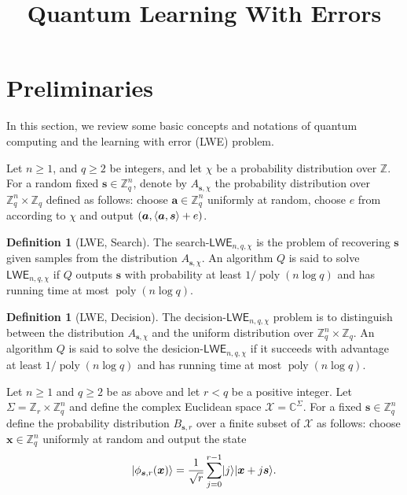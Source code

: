 \documentclass[11pt]{article}
\title{Quantum Learning With Errors}
\author{
}
\date{}
\theoremstyle{plain}
\theoremstyle{definition}
\newtheorem{definition}[theorem]{Definition}
\DeclareMathOperator{\poly}{poly}
\DeclarePairedDelimiter{\ldbrac}{\lvert}{\rangle}
\DeclarePairedDelimiter{\lrang}{\langle}{\rangle}
\def\C{\ensuremath{\mathbb{C}}}
\def\Z{\ensuremath{\mathbb{Z}}}
\def\lwe{\ensuremath{\mathsf{LWE}}}
\begin{document}
\maketitle








\section{Preliminaries}


In this section, we review some basic concepts and notations of quantum computing and the learning with error (LWE) problem. 

Let $n \ge 1$, and $q \ge 2$ be integers, and let $\chi$ be a probability distribution over $\Z$. For a random fixed $\bm{s} \in \Z_q^n$, denote by $A_{\bm{s}, \chi}$ the probability distribution over $\Z_q^n \times \Z_q$ defined as follows: choose $\bm{a} \in \Z_q^n$ uniformly at random, choose $e$ from according to $\chi$ and output  $(\bm{a}, \lrang{\bm{a}, \bm{s}} + e)$.
\begin{definition}[LWE, Search]
The search-$\lwe_{n, q, \chi}$ is the problem of recovering $\bm{s}$ given samples from the distribution $A_{\bm{s}, \chi}$. An algorithm $Q$ is said to solve $\lwe_{n, q, \chi}$ if $Q$  outputs $\bm{s}$ with probability at least $1 / \poly(n\log q)$ and has running time at most $\poly(n \log q)$.
\end{definition}
\begin{definition}[LWE, Decision]
    The decision-$\lwe_{n, q, \chi}$ problem is to distinguish between the distribution $A_{\bm{s}, \chi}$ and the uniform distribution over $\Z_q^n \times \Z_q$. An algorithm $Q$ is said to solve the desicion-$\lwe_{n, q, \chi}$ if it succeeds with advantage at least $1 / \poly(n\log q)$ and has running time at most $\poly(n\log q)$. 
\end{definition}
Let $n \ge 1$ and $q \ge 2$ be as above and let $r < q$ be a positive integer. Let $\Sigma = \Z_r \times \Z_q^n$ and define the complex Euclidean space $\mathcal{X} = \C^\Sigma$. For a fixed $\bm{s} \in \Z_q^n$ define the probability distribution $B_{\bm{s}, r}$ over a finite subset of $\mathcal{X}$ as follows: choose $\bm{x} \in \Z_q^n$ uniformly at random and output the state
\[ \ldbrac{\phi_{\bm{s}, r}(\bm{x})} = \frac{1}{\sqrt{r}} \sum_{j = 0}^{r - 1}\ldbrac{j}\ldbrac{\bm{x} + j\bm{s}}. \]
\end{document}
